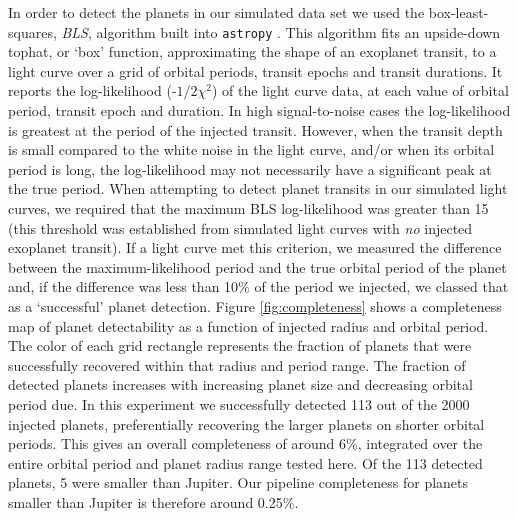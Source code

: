 In order to detect the planets in our simulated data set we used the
box-least-squares, {\it BLS}, algorithm built into {\tt astropy}
\citep{astropy}.
This algorithm fits an upside-down tophat, or `box' function, approximating
the shape of an exoplanet transit, to a light curve over a grid of orbital
periods, transit epochs and transit durations.
It reports the log-likelihood (-$1/2\chi^2$) of the light curve data, at each
value of orbital period, transit epoch and duration.
In high signal-to-noise cases the log-likelihood is greatest at the period of
the injected transit.
However, when the transit depth is small compared to the white noise in the
light curve, and/or when its orbital period is long, the log-likelihood may not
necessarily have a significant peak at the true period.
When attempting to detect planet transits in our simulated light curves, we
required that the maximum BLS log-likelihood was greater than 15 (this
threshold was established from simulated light curves with {\it no} injected
exoplanet transit).
If a light curve met this criterion, we measured the difference between the
maximum-likelihood period and the true orbital period of the planet and, if
the difference was less than 10\% of the period we injected, we classed that
as a `successful' planet detection.
Figure \ref{fig:completeness} shows a completeness map of planet detectability
as a function of injected radius and orbital period.
The color of each grid rectangle represents the fraction of planets that were
successfully recovered within that radius and period range.
The fraction of detected planets increases with increasing planet size and
decreasing orbital period due.
In this experiment we successfully detected 113 out of the 2000 injected
planets, preferentially recovering the larger planets on shorter orbital
periods.
This gives an overall completeness of around 6\%, integrated over the entire
orbital period and planet radius range tested here.
Of the 113 detected planets, 5 were smaller than Jupiter.
Our pipeline completeness for planets smaller than Jupiter is therefore around
0.25\%.


